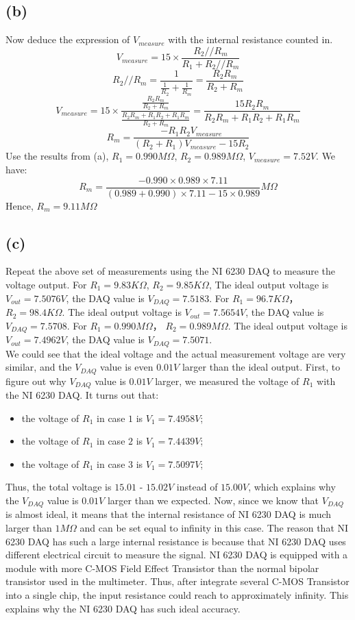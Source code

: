 \documentclass[letterpaper]{article}
\begin{document}
\subsection*{(b)}
Now deduce the expression of $V_{measure}$ with the internal resistance counted in.
$$V_{measure}=15\times\frac{R_2//R_m}{R_1+R_2//R_m}$$
$$R_2//R_m=\frac{1}{\frac{1}{R_2}+\frac{1}{R_m}}=\frac{R_2R_m}{R_2+R_m}$$
$$V_{measure}=15\times\frac{\frac{R_2R_m}{R_2+R_m}}{\frac{R_2R_m+R_1R_2+R_1R_m}{R_2+R_m}}=\frac{15R_2R_m}{R_2R_m+R_1R_2+R_1R_m}$$
$$R_m=\frac{-R_1R_2V_{measure}}{(R_2+R_1)V_{measure}-15R_2}$$
Use the results from (a), $R_1 = 0.990 M\Omega$, $R_2=0.989 M\Omega$, $V_{measure}=7.52 V$. We have: 
$$R_m=\frac{-0.990\times 0.989 \times 7.11}{(0.989+0.990)\times 7.11-15\times 0.989}M\Omega$$
Hence, $R_m=9.11M\Omega$
\subsection*{(c)}
Repeat the above set of measurements using the NI 6230 DAQ to measure the voltage output. For $R_1 = 9.83K\Omega$, $R_2=9.85 K\Omega$, The ideal output voltage is $V_{out}=7.5076 V$, the DAQ value is $V_{DAQ}=7.5183$. For $R_1 = 96.7K\Omega$， $R_2=98.4 K\Omega$. The ideal output voltage is $V_{out}=7.5654 V$, the DAQ value is $V_{DAQ}=7.5708$. For $R_1 = 0.990M\Omega$， $R_2=0.989 M\Omega$. The ideal output voltage is $V_{out}=7.4962 V$, the DAQ value is $V_{DAQ}=7.5071$.\\
We could see that the ideal voltage and the actual measurement voltage are very similar, and the $V_{DAQ}$ value is even $0.01V$ larger than the ideal output. First, to figure out why $V_{DAQ}$ value is $0.01V$ larger, we measured the voltage of $R_1$ with the NI 6230 DAQ. It turns out that:
\begin{itemize}
	\item the voltage of $R_1$ in case $1$ is $V_1=7.4958V$;  
	\item the voltage of $R_1$ in case $2$ is $V_1=7.4439V$;
	\item the voltage of $R_1$ in case $3$ is $V_1=7.5097V$;
\end{itemize} 	
Thus, the total voltage is $15.01$ - $15.02V$ instead of $15.00V$, which explains why the $V_{DAQ}$ value is $0.01V$ larger than we expected.
Now, since we know that $V_{DAQ}$ is almost ideal, it means that the internal resistance of NI 6230 DAQ is much larger than $1 M\Omega$ and can be set equal to infinity in this case. The reason that NI 6230 DAQ has such a large internal resistance is because that NI 6230 DAQ uses different electrical circuit to measure the signal. NI 6230 DAQ is equipped with a module with more C-MOS Field Effect Transistor than the normal bipolar transistor used in the multimeter. Thus, after integrate several C-MOS Transistor into a single chip, the input resistance could reach to approximately infinity. This explains why the NI 6230 DAQ has such ideal accuracy.
\end{document}
